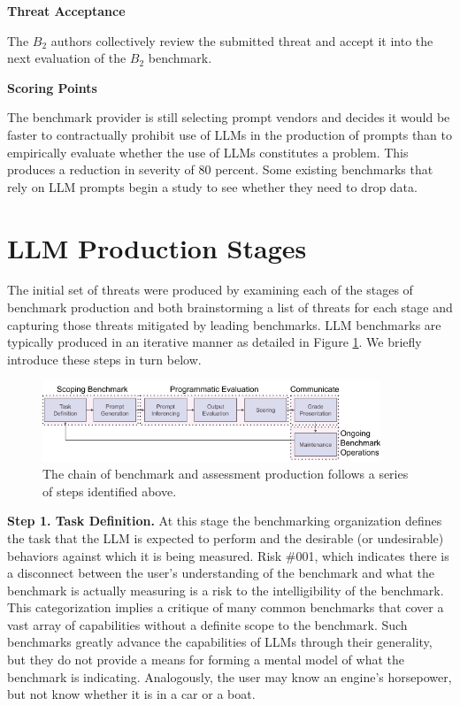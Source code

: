 \documentclass{article}
\newcommand\bb{$B_2$ }
\begin{document}
\textbf{Threat Acceptance}

The \bb authors collectively review the submitted threat and accept it into the next evaluation of the \bb benchmark.

\textbf{Scoring Points}

The benchmark provider is still selecting prompt vendors and decides it would be faster to contractually prohibit use of LLMs in the production of prompts than to empirically evaluate whether the use of LLMs constitutes a problem. This produces a reduction in severity of 80 percent. Some existing benchmarks that rely on LLM prompts begin a study to see whether they need to drop data.
\section{LLM Production Stages}
The initial set of threats were produced by examining each of the stages of benchmark production and both brainstorming a list of threats for each stage and capturing those threats mitigated by leading benchmarks.  LLM benchmarks are typically produced in an iterative manner as detailed in Figure \ref{fig:benchmark-production}. We briefly introduce these steps in turn below.

\begin{figure}[h!]
  \centering
  \includegraphics[width=0.9\textwidth]{image1.png}
  \caption{The chain of benchmark and assessment production follows a series of steps identified above.}
  \label{fig:benchmark-production}
\end{figure}

{\bf Step 1. Task Definition.} At this stage the benchmarking organization defines the task that the LLM is expected to perform and the desirable (or undesirable) behaviors against which it is being measured. Risk \#001, which indicates there is a disconnect between the user's understanding of the benchmark and what the benchmark is actually measuring is a risk to the intelligibility of the benchmark. This categorization implies a critique of many common benchmarks that cover a vast array of capabilities without a definite scope to the benchmark. Such benchmarks greatly advance the capabilities of LLMs through their generality, but they do not provide a means for forming a mental model of what the benchmark is indicating. Analogously, the user may know an engine's horsepower, but not know whether it is in a car or a boat.
\end{document}
